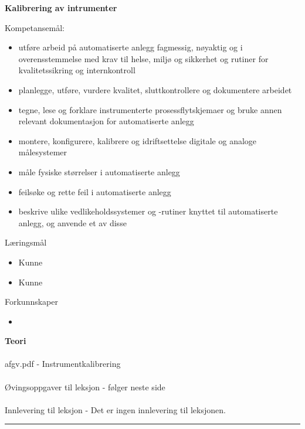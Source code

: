 \centerline{\bf Kalibrering av intrumenter}  \bigskip

Kompetansemål:
\begin{itemize}[noitemsep]

	\item utføre arbeid på automatiserte anlegg fagmessig, nøyaktig og i overensstemmelse med krav til helse, miljø og sikkerhet og rutiner for kvalitetssikring og internkontroll
	\item planlegge, utføre, vurdere kvalitet, sluttkontrollere og dokumentere arbeidet
	\item tegne, lese og forklare instrumenterte prosessflytskjemaer og bruke annen relevant dokumentasjon for automatiserte anlegg
	\item montere, konfigurere, kalibrere og idriftsettelse digitale og analoge målesystemer
	\item måle fysiske størrelser i automatiserte anlegg
	\item feilsøke og rette feil i automatiserte anlegg
	\item beskrive ulike vedlikeholdssystemer og -rutiner knyttet til automatiserte anlegg, og anvende et av disse
\end{itemize}
	Læringsmål
	\begin{itemize}[noitemsep]
		\item Kunne 
		\item Kunne 
	\end{itemize}

	Forkunnskaper

	\begin{itemize}[noitemsep]
		\item 

	\end{itemize}
\textbf{Teori}\\\\
afgv.pdf - Instrumentkalibrering\\\\
Øvingsoppgaver til leksjon - følger neste side\\\\
Innlevering til leksjon - Det er ingen innlevering til leksjonen. 
\bigskip 
\hrule
\vfil \eject
